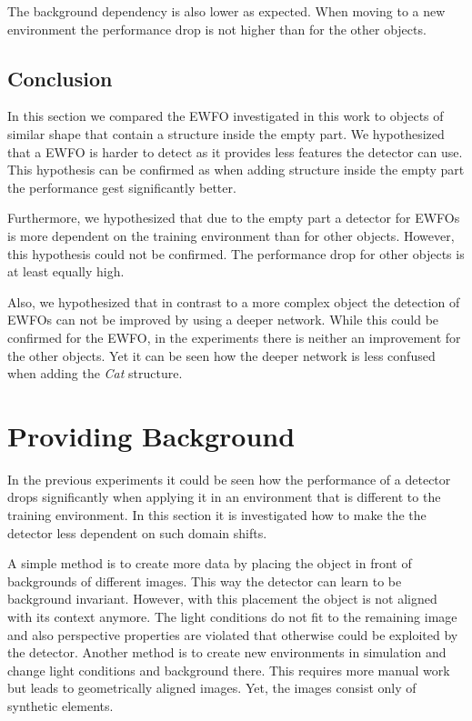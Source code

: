 The background dependency is also lower as expected. When moving to a new environment the performance drop is not higher than for the other objects.


\subsection{Conclusion}

In this section we compared the \ac{EWFO} investigated in this work to objects of similar shape that contain a structure inside the empty part. We hypothesized that a \ac{EWFO} is harder to detect as it provides less features the detector can use. This hypothesis can be confirmed as when adding structure inside the empty part the performance gest significantly better. 

Furthermore, we hypothesized that due to the empty part a detector for \acp{EWFO} is more dependent on the training environment than for other objects. However, this hypothesis could not be confirmed. The performance drop for other objects is at least equally high. 

Also, we hypothesized that in contrast to a more complex object the detection of \acp{EWFO} can not be improved by using a deeper network. While this could be confirmed for the \ac{EWFO}, in the experiments there is neither an improvement for the other objects. Yet it can be seen how the deeper network is less confused when adding the \textit{Cat} structure.

\section{Providing Background}

In the previous experiments it could be seen how the performance of a detector drops significantly when applying it in an environment that is different to the training environment. In this section it is investigated how to make the the detector less dependent on such domain shifts.

A simple method is to create more data by placing the object in front of backgrounds of different images. This way the detector can learn to be background invariant. However, with this placement the object is not aligned with its context anymore. The light conditions do not fit to the remaining image and also perspective properties are violated that otherwise could be exploited by the detector. Another method is to create new environments in simulation and change light conditions and background there. This requires more manual work but leads to geometrically aligned images. Yet, the images consist only of synthetic elements.

